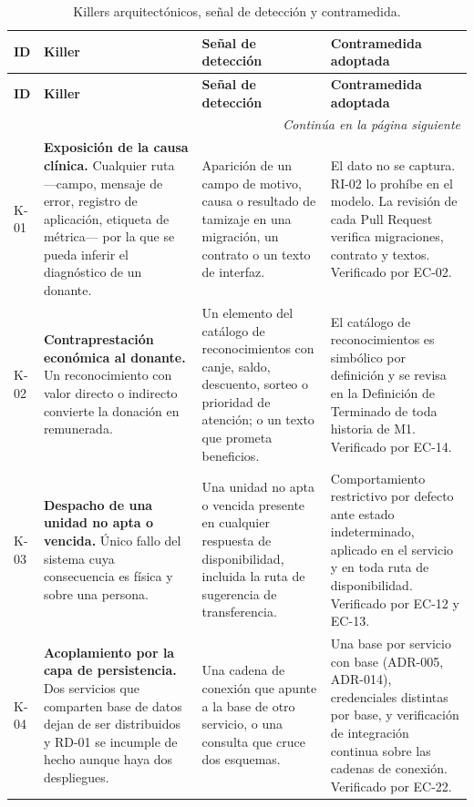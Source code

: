 \documentclass[11pt,a4paper]{article}
\newcommand{\contlinea}[1]{\multicolumn{#1}{r}{\footnotesize\itshape Continúa en la página siguiente}}
\begin{document}
\begin{longtable}{L{1.3cm} L{3.6cm} L{4.4cm} L{4.6cm}}
\caption{Killers arquitectónicos, señal de detección y contramedida.}\label{tab:killers}\\
\toprule
\textbf{ID} & \textbf{Killer} & \textbf{Señal de detección} & \textbf{Contramedida adoptada} \\
\midrule
\endfirsthead
\toprule
\textbf{ID} & \textbf{Killer} & \textbf{Señal de detección} & \textbf{Contramedida adoptada} \\
\midrule
\endhead
\midrule
\contlinea{4} \\
\endfoot
\bottomrule
\endlastfoot
K-01 & \textbf{Exposición de la causa clínica.} Cualquier ruta ---campo, mensaje de error, registro de aplicación, etiqueta de métrica--- por la que se pueda inferir el diagnóstico de un donante. & Aparición de un campo de motivo, causa o resultado de tamizaje en una migración, un contrato o un texto de interfaz. & El dato no se captura. RI-02 lo prohíbe en el modelo. La revisión de cada Pull Request verifica migraciones, contrato y textos. Verificado por EC-02. \\
K-02 & \textbf{Contraprestación económica al donante.} Un reconocimiento con valor directo o indirecto convierte la donación en remunerada. & Un elemento del catálogo de reconocimientos con canje, saldo, descuento, sorteo o prioridad de atención; o un texto que prometa beneficios. & El catálogo de reconocimientos es simbólico por definición y se revisa en la Definición de Terminado de toda historia de M1. Verificado por EC-14. \\
K-03 & \textbf{Despacho de una unidad no apta o vencida.} Único fallo del sistema cuya consecuencia es física y sobre una persona. & Una unidad no apta o vencida presente en cualquier respuesta de disponibilidad, incluida la ruta de sugerencia de transferencia. & Comportamiento restrictivo por defecto ante estado indeterminado, aplicado en el servicio y en toda ruta de disponibilidad. Verificado por EC-12 y EC-13. \\
K-04 & \textbf{Acoplamiento por la capa de persistencia.} Dos servicios que comparten base de datos dejan de ser distribuidos y RD-01 se incumple de hecho aunque haya dos despliegues. & Una cadena de conexión que apunte a la base de otro servicio, o una consulta que cruce dos esquemas. & Una base por servicio con base (ADR-005, ADR-014), credenciales distintas por base, y verificación de integración continua sobre las cadenas de conexión. Verificado por EC-22. \\

\end{longtable}
\end{document}
